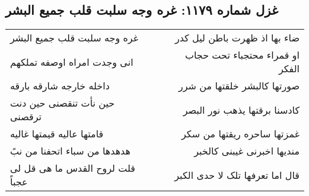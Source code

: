 \begin{center}
\section*{غزل شماره ۱۱۷۹: غره وجه سلبت قلب جمیع البشر}
\label{sec:1179}
\begin{longtable}{l p{0.5cm} r}
غره وجه سلبت قلب جمیع البشر
&&
ضاء بها اذ ظهرت باطن لیل کدر
\\
انی وجدت امراه اوصفه تملکهم
&&
او قمراء محتجباء تحت حجاب الفکر
\\
داخله خارجه شارقه بارقه
&&
صورتها کالبشر خلقتها من شرر
\\
حین نأت تنقصنی حین دنت ترقصنی
&&
کادسنا برقتها یذهب نور البصر
\\
قامتها عالیه قیمتها غالیه
&&
غمزتها ساحره ریقتها من سکر
\\
هدهدها من سباء اتحفنا من نبً
&&
مندیها اخبرنی غیبنی کالخبر
\\
قلت لروح القدس ما هی قل لی عجباً
&&
قال اما تعرفها تلک لا حدی الکبر
\\
\end{longtable}
\end{center}
